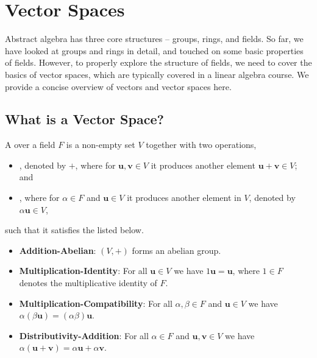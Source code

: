 \chapter{Vector Spaces}
Abstract algebra has three core structures -- groups, rings, and fields. So far, we have looked at groups and rings in detail, and touched on some basic properties of fields. However, to properly explore the structure of fields, we need to cover the basics of vector spaces, which are typically covered in a linear algebra course. We provide a concise overview of vectors and vector spaces here.

\section{What is a Vector Space?}
\begin{definition}
    A  over a field $F$ is a non-empty set $V$ together with two operations,
    \begin{itemize}
        \item {}, denoted by $+$, where for $\mathbf{u}, \mathbf{v} \in V$ it produces another element $\mathbf{u} + \mathbf{v} \in V$; and
        \item {}, where for $\alpha \in F$ and $\mathbf{u} \in V$ it produces another element in $V$, denoted by $\alpha\mathbf{u} \in V$,
    \end{itemize}
    such that it satisfies the  listed below.
    \begin{itemize}
        \item \textbf{Addition-Abelian}: $(V, +)$ forms an abelian group.

        \item \textbf{Multiplication-Identity}: For all $\mathbf{u} \in V$ we have $1\mathbf{u} = \mathbf{u}$, where $1 \in F$ denotes the multiplicative identity of $F$.

        \item \textbf{Multiplication-Compatibility}: For all $\alpha,\beta \in F$ and $\mathbf{u} \in V$ we have $\alpha(\beta\mathbf{u}) = (\alpha\beta)\mathbf{u}$.

        \item \textbf{Distributivity-Addition}: For all $\alpha \in F$ and $\mathbf{u}, \mathbf{v} \in V$ we have $\alpha(\mathbf{u} + \mathbf{v}) = \alpha\mathbf{u} + \alpha\mathbf{v}$.


\end{itemize}
\end{definition}
